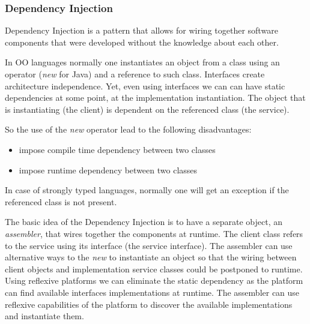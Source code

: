 \subsubsection{Dependency Injection}

Dependency Injection is a pattern that allows for wiring together software components that were developed without the knowledge about each other.~\cite{fowler_inversion_2004}

In OO languages normally one instantiates an object from a class using an operator (\emph{new} for Java) and a reference to such class.
Interfaces create architecture independence. Yet, even using interfaces we can can have static dependencies at some point, at the implementation instantiation.
The object that is instantiating (the client) is dependent on the referenced class (the service).

So the use of the \emph{new} operator lead to the following disadvantages:
\begin{itemize}
  \item impose compile time dependency between two classes
  \item impose runtime dependency between two classes
\end{itemize}

In case of strongly typed languages, normally one will get an exception if the referenced class is not present.

The basic idea of the Dependency Injection is to have a separate object, an \emph{assembler}, that wires together the components at runtime\cite{fowler_inversion_2004}. The client class refers to the service using its interface (the service interface). The assembler can use alternative ways to the \emph{new} to instantiate an object so that the wiring between client objects and implementation service classes could be postponed to runtime. Using reflexive platforms we can eliminate the static dependency as the platform can find available interfaces implementations at runtime.
The assembler can use reflexive capabilities of the platform to discover the available implementations and instantiate them.

